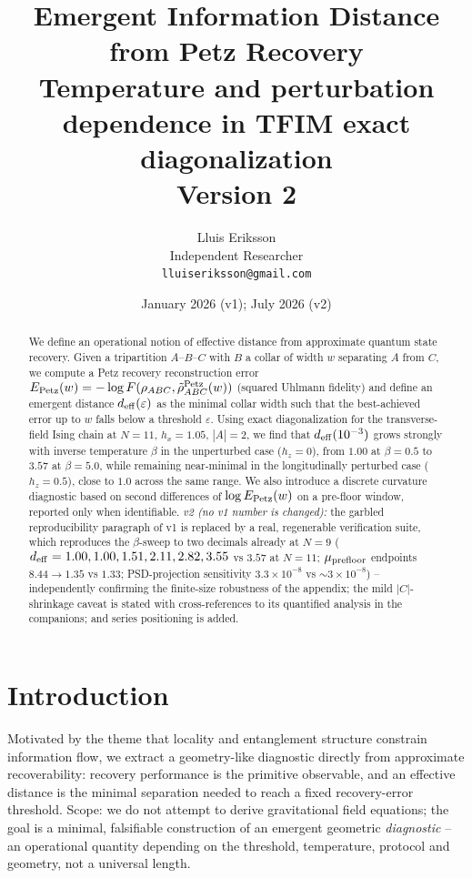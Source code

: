 \documentclass[11pt]{article}
\title{Emergent Information Distance from Petz Recovery\\
{\large Temperature and perturbation dependence in TFIM exact
diagonalization}\\
{\normalsize Version 2}}
\author{Lluis Eriksson\\ Independent Researcher\\ \texttt{lluiseriksson@gmail.com}}
\date{January 2026 (v1); July 2026 (v2)}
\theoremstyle{remark}
\newcommand{\deff}{d_{\rm eff}}
\begin{document}
\maketitle

\begin{abstract}
We define an operational notion of effective distance from approximate
quantum state recovery. Given a tripartition $A$--$B$--$C$ with $B$ a
collar of width $w$ separating $A$ from $C$, we compute a Petz recovery
reconstruction error $E_{\rm Petz}(w) = -\log F(\rho_{ABC},
\tilde\rho^{\rm Petz}_{ABC}(w))$ (squared Uhlmann fidelity) and define an
emergent distance $\deff(\varepsilon)$ as the minimal collar width such
that the best-achieved error up to $w$ falls below a threshold
$\varepsilon$. Using exact diagonalization for the transverse-field Ising
chain at $N = 11$, $h_x = 1.05$, $|A| = 2$, we find that
$\deff(10^{-3})$ grows strongly with inverse temperature $\beta$ in the
unperturbed case ($h_z = 0$), from $1.00$ at $\beta = 0.5$ to $3.57$ at
$\beta = 5.0$, while remaining near-minimal in the longitudinally
perturbed case ($h_z = 0.5$), close to $1.0$ across the same range. We
also introduce a discrete curvature diagnostic based on second
differences of $\log E_{\rm Petz}(w)$ on a pre-floor window, reported
only when identifiable. \emph{v2 (no v1 number is changed):} the garbled
reproducibility paragraph of v1 is replaced by a real, regenerable
verification suite, which reproduces the $\beta$-sweep to two decimals
already at $N = 9$ ($\deff = 1.00, 1.00, 1.51, 2.11, 2.82, 3.55$ vs
$3.57$ at $N = 11$; $\mu_{\rm prefloor}$ endpoints $8.44 \to 1.35$ vs
$1.33$; PSD-projection sensitivity $3.3\times10^{-8}$ vs
$\sim 3\times10^{-8}$) -- independently confirming the finite-size
robustness of the appendix; the mild $|C|$-shrinkage caveat is stated
with cross-references to its quantified analysis in the companions; and
series positioning is added.
\end{abstract}

\section{Introduction}
Motivated by the theme that locality and entanglement structure constrain
information flow, we extract a geometry-like diagnostic directly from
approximate recoverability: recovery performance is the primitive
observable, and an effective distance is the minimal separation needed to
reach a fixed recovery-error threshold. Scope: we do not attempt to
derive gravitational field equations; the goal is a minimal, falsifiable
construction of an emergent geometric \emph{diagnostic} -- an operational
quantity depending on the threshold, temperature, protocol and geometry,
not a universal length.
\end{document}
